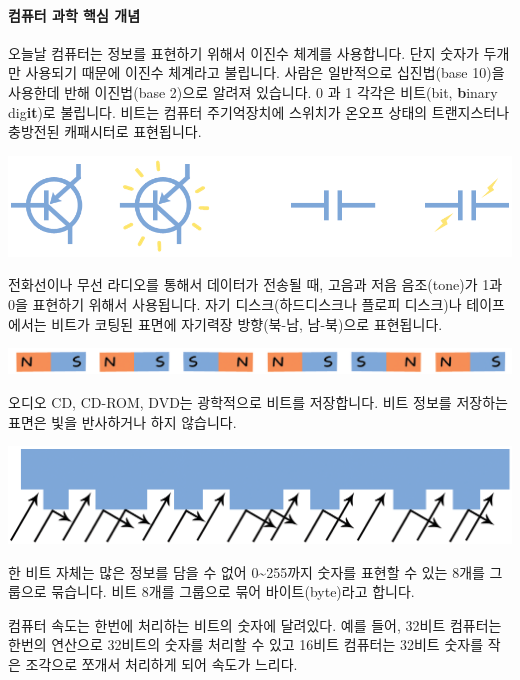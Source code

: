 \documentclass[]{article}
\begin{document}
\mbox{}\paragraph{컴퓨터 과학 핵심 개념}\label{section-20}

오늘날 컴퓨터는 정보를 표현하기 위해서 이진수 체계를 사용합니다. 단지
숫자가 두개만 사용되기 때문에 이진수 체계라고 불립니다. 사람은
일반적으로 십진법(base 10)을 사용한데 반해 이진법(base 2)으로 알려져
있습니다. 0 과 1 각각은 비트(bit, \textbf{b}inary dig\textbf{it})로
불립니다. 비트는 컴퓨터 주기억장치에 스위치가 온오프 상태의 트랜지스터나
충방전된 캐패시터로 표현됩니다.

\includegraphics{csunplugged/01-part/img/ch01-binary/01-binary-10-what-is-it-all-about-01.png}

전화선이나 무선 라디오를 통해서 데이터가 전송될 때, 고음과 저음
음조(tone)가 1과 0을 표현하기 위해서 사용됩니다. 자기
디스크(하드디스크나 플로피 디스크)나 테이프에서는 비트가 코팅된 표면에
자기력장 방향(북-남, 남-북)으로 표현됩니다.

\includegraphics{csunplugged/01-part/img/ch01-binary/01-binary-10-what-is-it-all-about-02.png}

오디오 CD, CD-ROM, DVD는 광학적으로 비트를 저장합니다. 비트 정보를
저장하는 표면은 빛을 반사하거나 하지 않습니다.

\includegraphics{csunplugged/01-part/img/ch01-binary/01-binary-10-what-is-it-all-about-03.png}

한 비트 자체는 많은 정보를 담을 수 없어 0\textasciitilde{}255까지 숫자를
표현할 수 있는 8개를 그룹으로 묶습니다. 비트 8개를 그룹으로 묶어
바이트(byte)라고 합니다.

컴퓨터 속도는 한번에 처리하는 비트의 숫자에 달려있다. 예를 들어, 32비트
컴퓨터는 한번의 연산으로 32비트의 숫자를 처리할 수 있고 16비트 컴퓨터는
32비트 숫자를 작은 조각으로 쪼개서 처리하게 되어 속도가 느리다.
\end{document}
